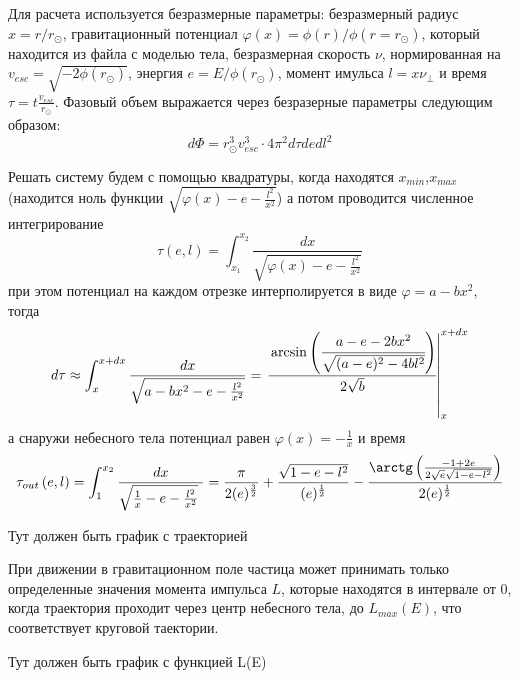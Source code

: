 Для расчета используется безразмерные параметры: безразмерный радиус $x = r/r_{\odot}$, гравитационный потенциал $\varphi(x) = \phi(r)/\phi(r = r_{\odot})$, который находится из файла с моделью тела, безразмерная скорость $\nu$, нормированная на $v_{esc} = \sqrt{-2\phi(r_{\odot})}$, энергия $e = E/\phi(r_{\odot})$, момент имульса $l = x \nu_{\perp}$ и время $\tau =  t \frac{v_{esc}}{r_{\odot}}$. Фазовый объем выражается через безразерные параметры следующим образом:
\begin{equation}
	\label{eq:phase_volume_nd}
	d\Phi = r_{\odot}^3v_{esc}^3 \cdot 4\pi^{2} d\tau de dl^2
\end{equation}


Решать систему будем с помощью квадратуры, когда находятся $x_{min}$,$x_{max}$ (находится ноль функции  $\sqrt{\varphi(x) -e - \frac{l^{2}}{x^{2}}}$) а потом проводится численное интегрирование 
\begin{equation}
	\tau\left( {e,l} \right) = {\int_{x_{1}}^{x_{2}}\frac{dx}{ \sqrt{\varphi(x) -e - \frac{l^{2}}{x^{2}}}}}
\end{equation}
при этом потенциал на каждом отрезке интерполируется в виде $\varphi = a-bx^2$, тогда
\begin{equation}
	\label{eq:eval_dt}
	d\tau \approx \int_{x}^{x+dx}\frac{dx}{ \sqrt{a-bx^2 -e - \frac{l^{2}}{x^{2}}}} = \left.\cfrac{\arcsin\left(
			\cfrac{a-e-2bx^2}{\sqrt{(a-e)^2-4bl^2}}
			\right)}{2\sqrt{b}}\right\rvert_{x}^{x+dx}
\end{equation}
а снаружи небесного тела потенциал равен $\varphi(x) = - \frac{1}{x}$ и время
\begin{equation}
	\label{eq:tau_out_eq}
	\tau_{out}\left( {e,l} \right) = {\int_{1}^{x_{2}}\frac{dx}{\sqrt{\frac{1}{x} - e - \frac{l^{2}}{x^{2}}}~}} = \frac{\pi}{2(e)^{\frac{3}{2}}} + \frac{\sqrt{1 - e - l^{2}}}{(e)^{\frac{1}{2}}} - \frac{{\arctg}\left( \frac{- 1 + 2e}{2\sqrt{e}\sqrt{1 - e - l^{2}}} \right)}{2(e)^{\frac{1}{2}}}
\end{equation}

\begin{LARGE}
	Тут должен быть график с траекторией
\end{LARGE}


При движении в гравитационном поле частица может принимать только определенные значения 
момента импульса $L$, которые находятся в интервале от $0$, когда траектория проходит через центр небесного тела, до $L_{max}(E)$, что соответствует круговой таектории.

\begin{LARGE}
	Тут должен быть график с функцией L(E)
\end{LARGE}

